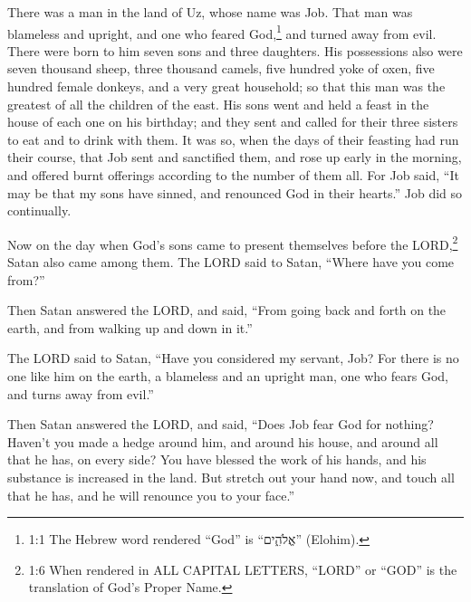 





\vspace{-1.36in}

\mychapter{} \myverse*{}There was a man in the land of Uz, whose name was Job. That man was blameless and upright, and one who feared God,\footnote{1:1 The Hebrew word rendered “God” is “אֱלֹהִ֑ים” (Elohim).} and turned away from evil. \myverse{}There were born to him seven sons and three daughters. \myverse{}His possessions also were seven thousand sheep, three thousand camels, five hundred yoke of oxen, five hundred female donkeys, and a very great household; so that this man was the greatest of all the children of the east. \myverse{}His sons went and held a feast in the house of each one on his birthday; and they sent and called for their three sisters to eat and to drink with them. \myverse{}It was so, when the days of their feasting had run their course, that Job sent and sanctified them, and rose up early in the morning, and offered burnt offerings according to the number of them all. For Job said, “It may be that my sons have sinned, and renounced God in their hearts.” Job did so continually.


\myverse{}Now on the day when God’s sons came to present themselves before the LORD,\footnote{1:6 When rendered in ALL CAPITAL LETTERS, “LORD” or “GOD” is the translation of God’s Proper Name.} Satan also came among them. \myverse{}The LORD said to Satan, “Where have you come from?”

Then Satan answered the LORD, and said, “From going back and forth on the earth, and from walking up and down in it.”


\myverse{}The LORD said to Satan, “Have you considered my servant, Job? For there is no one like him on the earth, a blameless and an upright man, one who fears God, and turns away from evil.”


\myverse{}Then Satan answered the LORD, and said, “Does Job fear God for
nothing? \myverse{}Haven’t you made a hedge around him, and around his house, and around all that he has, on every side? You have blessed the work of his hands, and his substance is increased in the land. \myverse{}But stretch out your hand now, and touch all that he has, and he will renounce you to your face.”


